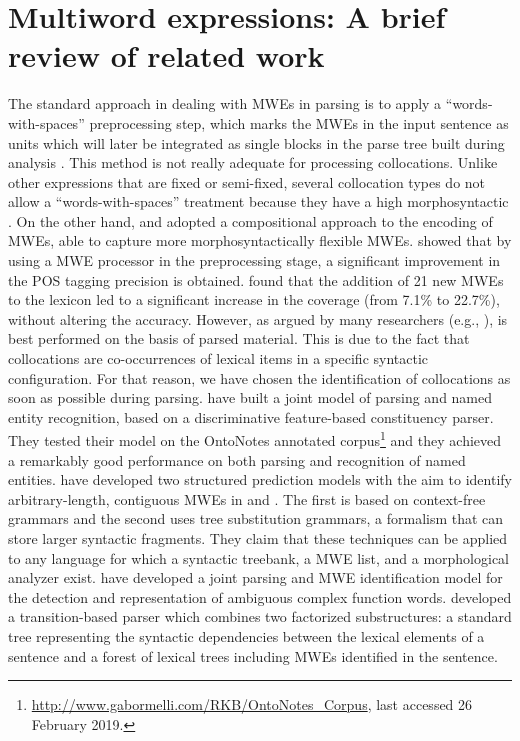 \documentclass[output=paper]{langsci/langscibook}
\begin{document}
\section{Multiword expressions: A brief review of related work}
\label{fou:sec2}
The standard approach in dealing with MWEs in parsing is to apply a ``words-with-spaces'' preprocessing step, which marks the MWEs in the input sentence as units which will later be integrated as single blocks in the parse tree built during analysis \citep{brun:1998,zhang06}. This method is not really adequate for processing collocations. Unlike other expressions that are fixed or semi-fixed, several collocation types do not allow a ``words-with-spaces'' treatment because they have a high morphosyntactic .
On the other hand, \cite{alegria04} and \cite{villavicencio07} adopted a compositional approach to the encoding of MWEs, able to capture more morphosyntactically flexible MWEs. \cite{alegria04} showed that by using a MWE processor in the preprocessing stage, a significant improvement in the POS tagging precision is obtained. \cite{villavicencio07} found that the addition of 21 new MWEs to the lexicon led to a significant increase in the  coverage (from 7.1\% to 22.7\%), without altering the  accuracy.
However, as argued by many researchers (e.g., \citealt{heid94,seretan11}),  is best performed on the basis of parsed material. This is due to the fact that collocations are co-occurrences of lexical items in a specific syntactic configuration. For that reason, we have chosen the identification of collocations as soon as possible during parsing. 
\cite{finkeljr09} have built a joint model of parsing and named entity recognition, based on a discriminative feature-based constituency parser. They tested their model on the OntoNotes annotated corpus\footnote{\url{http://www.gabormelli.com/RKB/OntoNotes_Corpus}, last accessed 26 February 2019.} and they achieved a remarkably good performance on both parsing and recognition of named entities. \cite{green13} have developed two structured prediction models with the aim to identify arbitrary-length, contiguous MWEs in  and . The first is based on context-free grammars and the second uses tree substitution grammars, a formalism that can store larger syntactic fragments. They claim that these techniques can be applied to any language for which a syntactic treebank, a MWE list, and a morphological analyzer exist. \cite{nasretal15} have developed a joint parsing and MWE identification model for the detection and representation of ambiguous complex function words. \cite{constantnivre16} developed a transition-based parser which combines two factorized substructures: a standard tree representing the syntactic dependencies between the lexical elements of a sentence and a forest of lexical trees including MWEs identified in the sentence. 
\end{document}
